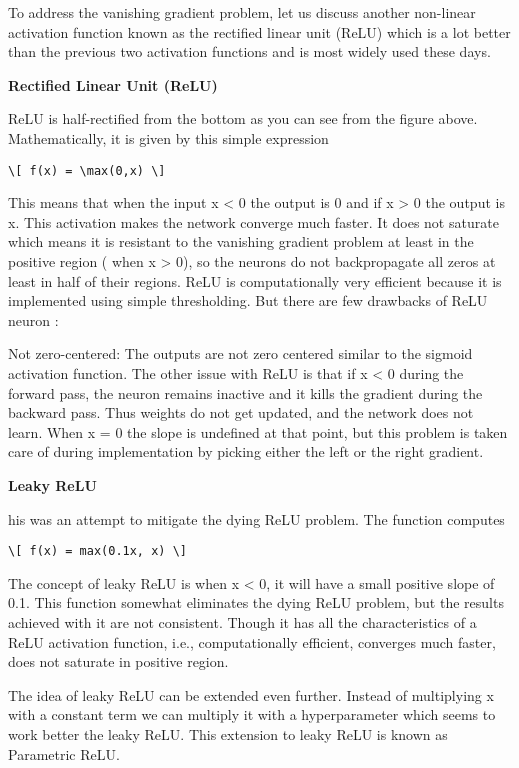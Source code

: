 \documentclass[11pt]{article}
\begin{document}
To address the vanishing gradient problem, let us discuss another
non-linear activation function known as the rectified linear unit (ReLU)
which is a lot better than the previous two activation functions and is
most widely used these days.

    \textbf{Rectified Linear Unit (ReLU)}

ReLU is half-rectified from the bottom as you can see from the figure
above. Mathematically, it is given by this simple expression

\begin{verbatim}
\[ f(x) = \max(0,x) \]
\end{verbatim}

This means that when the input x \textless{} 0 the output is 0 and if x
\textgreater{} 0 the output is x. This activation makes the network
converge much faster. It does not saturate which means it is resistant
to the vanishing gradient problem at least in the positive region ( when
x \textgreater{} 0), so the neurons do not backpropagate all zeros at
least in half of their regions. ReLU is computationally very efficient
because it is implemented using simple thresholding. But there are few
drawbacks of ReLU neuron :

Not zero-centered: The outputs are not zero centered similar to the
sigmoid activation function. The other issue with ReLU is that if x
\textless{} 0 during the forward pass, the neuron remains inactive and
it kills the gradient during the backward pass. Thus weights do not get
updated, and the network does not learn. When x = 0 the slope is
undefined at that point, but this problem is taken care of during
implementation by picking either the left or the right gradient.

\textbf{Leaky ReLU}

his was an attempt to mitigate the dying ReLU problem. The function
computes

\begin{verbatim}
\[ f(x) = max(0.1x, x) \]
\end{verbatim}

The concept of leaky ReLU is when x \textless{} 0, it will have a small
positive slope of 0.1. This function somewhat eliminates the dying ReLU
problem, but the results achieved with it are not consistent. Though it
has all the characteristics of a ReLU activation function, i.e.,
computationally efficient, converges much faster, does not saturate in
positive region.

The idea of leaky ReLU can be extended even further. Instead of
multiplying x with a constant term we can multiply it with a
hyperparameter which seems to work better the leaky ReLU. This extension
to leaky ReLU is known as Parametric ReLU.
\end{document}
